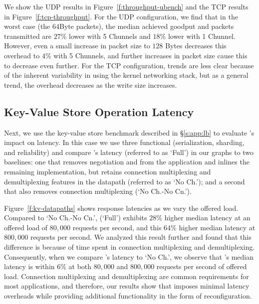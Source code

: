 We show the UDP results in Figure~\ref{f:throughput-ubench} and the TCP results in Figure~\ref{f:tcp-throughput}. For the UDP configuration, we find that in the worst case (the $64$Byte packets), the median achieved goodput and packets transmitted are $27\%$ lower with 5 Chunnels and $18\%$ lower with 1 Chunnel. However, even a small increase in packet size to $128$ Bytes decreases this overhead to $4\%$ with 5 Chunnels, and further increases in packet size cause this to decrease even further.
For the TCP configuration, trends are less clear because of the inherent variability in using the kernel networking stack, but as a general trend, the overhead decreases as the write size increases.


\subsection{Key-Value Store Operation Latency}\label{s:eval:kv-overhead}
Next, we use the key-value store benchmark described in \S\ref{s:app:lb} to evaluate \name's impact on latency. In this case we use three functional \tunnels (serialization, sharding, and reliability) and compare \name's latency (referred to as `Full') in our graphs to two baselines: one that removes negotiation and \tunnels from the application and inlines the remaining implementation, but retains connection multiplexing and demultiplexing features in the datapath (referred to as `No Ch.'); and a second that also removes connection multiplexing (`No Ch.-No Cn.').

Figure~\ref{f:kv-datapaths} shows response latencies as we vary the offered load. Compared to `No Ch.-No Cn.', \name (`Full') exhibits $28\%$ higher median latency at an offered load of $80,000$ requests per second, and this $64\%$ higher median latency at $800,000$ requests per second. We analyzed this result further and found that this difference is because of time spent in connection multiplexing and demultiplexing. Consequently,  when we compare \name's latency to `No Ch.', we observe that \name's median latency is within $6\%$ at both $80,000$ and $800,000$ requests per second of offered load. Connection multiplexing and demultiplexing are common requirements for most applications, and therefore, our results show that \name imposes minimal latency overheads while providing additional functionality in the form of reconfiguration.




